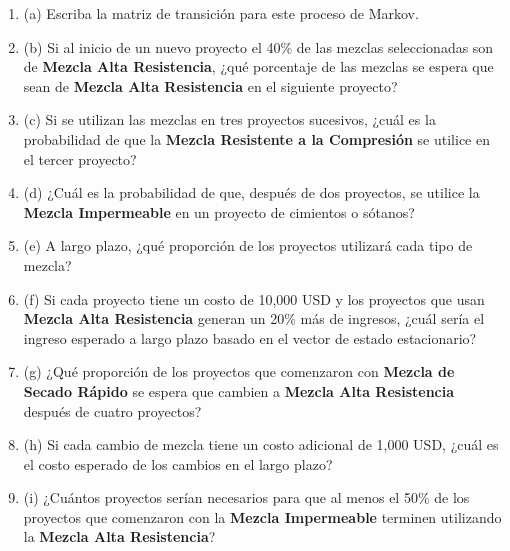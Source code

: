 \documentclass{article}
\begin{document}
\begin{enumerate}
    \item (a) Escriba la matriz de transición para este proceso de Markov.
    
    \item (b) Si al inicio de un nuevo proyecto el 40\% de las mezclas seleccionadas son de \textbf{Mezcla Alta Resistencia}, ¿qué porcentaje de las mezclas se espera que sean de \textbf{Mezcla Alta Resistencia} en el siguiente proyecto?

    \item (c) Si se utilizan las mezclas en tres proyectos sucesivos, ¿cuál es la probabilidad de que la \textbf{Mezcla Resistente a la Compresión} se utilice en el tercer proyecto?

    \item (d) ¿Cuál es la probabilidad de que, después de dos proyectos, se utilice la \textbf{Mezcla Impermeable} en un proyecto de cimientos o sótanos?

    \item (e) A largo plazo, ¿qué proporción de los proyectos utilizará cada tipo de mezcla?

    \item (f) Si cada proyecto tiene un costo de 10,000 USD y los proyectos que usan \textbf{Mezcla Alta Resistencia} generan un 20\% más de ingresos, ¿cuál sería el ingreso esperado a largo plazo basado en el vector de estado estacionario?

    \item (g) ¿Qué proporción de los proyectos que comenzaron con \textbf{Mezcla de Secado Rápido} se espera que cambien a \textbf{Mezcla Alta Resistencia} después de cuatro proyectos?

    \item (h) Si cada cambio de mezcla tiene un costo adicional de 1,000 USD, ¿cuál es el costo esperado de los cambios en el largo plazo?

    \item (i) ¿Cuántos proyectos serían necesarios para que al menos el 50\% de los proyectos que comenzaron con la \textbf{Mezcla Impermeable} terminen utilizando la \textbf{Mezcla Alta Resistencia}?
\end{enumerate}
\end{document}
